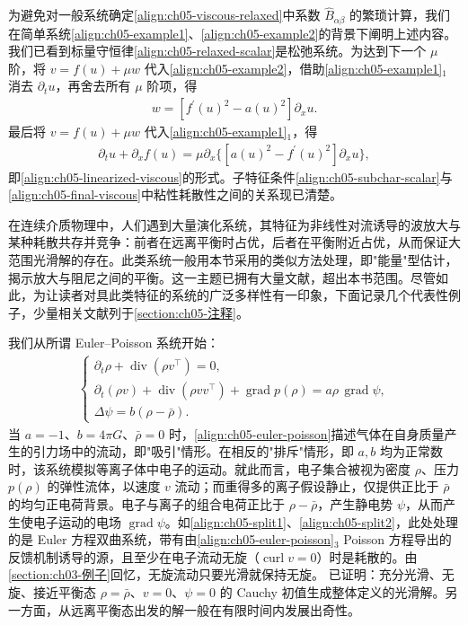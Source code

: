 \documentclass[../../main.tex]{subfiles}
\begin{document}
为避免对一般系统确定\eqref{align:ch05-viscous-relaxed}中系数 $\hat{B}_{\alpha\beta}$ 的繁琐计算，我们在简单系统\eqref{align:ch05-example1}、\eqref{align:ch05-example2}的背景下阐明上述内容。我们已看到标量守恒律\eqref{align:ch05-relaxed-scalar}是松弛系统。为达到下一个 $\mu$ 阶，将 $v=f(u)+\mu w$ 代入\eqref{align:ch05-example2}，借助\eqref{align:ch05-example1}$_1$ 消去 $\partial_{t}u$，再舍去所有 $\mu$ 阶项，得
\begin{align}
w=[f^{\prime}(u)^{2}-a(u)^{2}]\partial_{x}u.\label{align:ch05-w-substitute}
\end{align}
最后将 $v=f(u)+\mu w$ 代入\eqref{align:ch05-example1}$_1$，得
\begin{align}
\partial_{t}u+\partial_{x}f(u)=\mu\partial_{x}\{[a(u)^{2}-f^{\prime}(u)^{2}]\partial_{x}u\},\label{align:ch05-final-viscous}
\end{align}
即\eqref{align:ch05-linearized-viscous}的形式。子特征条件\eqref{align:ch05-subchar-scalar}与\eqref{align:ch05-final-viscous}中粘性耗散性之间的关系现已清楚。

在连续介质物理中，人们遇到大量演化系统，其特征为非线性对流诱导的波放大与某种耗散共存并竞争：前者在远离平衡时占优，后者在平衡附近占优，从而保证大范围光滑解的存在。此类系统一般用本节采用的类似方法处理，即"能量"型估计，揭示放大与阻尼之间的平衡。这一主题已拥有大量文献，超出本书范围。尽管如此，为让读者对具此类特征的系统的广泛多样性有一印象，下面记录几个代表性例子，少量相关文献列于\cref{section:ch05-注释}。

我们从所谓 Euler--Poisson 系统开始：
\begin{align}
\begin{cases}
\partial_{t}\rho+\operatorname{div}(\rho v^{\top})=0,\\
\partial_{t}(\rho v)+\operatorname{div}(\rho vv^{\top})+\operatorname{grad}p(\rho)=a\rho\,\operatorname{grad}\psi,\\
\Delta\psi=b(\rho-\bar{\rho}).
\end{cases}\label{align:ch05-euler-poisson}
\end{align}
当 $a=-1$、$b=4\pi G$、$\bar{\rho}=0$ 时，\eqref{align:ch05-euler-poisson}描述气体在自身质量产生的引力场中的流动，即"吸引"情形。在相反的"排斥"情形，即 $a,b$ 均为正常数时，该系统模拟等离子体中电子的运动。就此而言，电子集合被视为密度 $\rho$、压力 $p(\rho)$ 的弹性流体，以速度 $v$ 流动；而重得多的离子假设静止，仅提供正比于 $\bar{\rho}$ 的均匀正电荷背景。电子与离子的组合电荷正比于 $\rho-\bar{\rho}$，产生静电势 $\psi$，从而产生使电子运动的电场 $\operatorname{grad}\psi$。如\eqref{align:ch05-split1}、\eqref{align:ch05-split2}，此处处理的是 Euler 方程双曲系统，带有由\eqref{align:ch05-euler-poisson}$_3$ Poisson 方程导出的反馈机制诱导的源，且至少在电子流动无旋（$\operatorname{curl}v=0$）时是耗散的。由\cref{section:ch03-例子}回忆，无旋流动只要光滑就保持无旋。
已证明：充分光滑、无旋、接近平衡态 $\rho=\bar{\rho}$、$v=0$、$\psi=0$ 的 Cauchy 初值生成整体定义的光滑解。另一方面，从远离平衡态出发的解一般在有限时间内发展出奇性。
\end{document}
